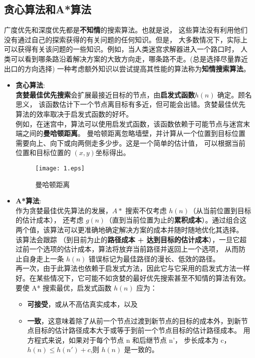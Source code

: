 \subsection{\textbf{贪心算法和A*算法}}
广度优先和深度优先都是\textbf{不知情}的搜索算法。也就是说，
这些算法没有利用他们没有通过自己的探索获得的有关问题的任何知识。但是，
大多数情况下，实际上可以获得有关该问题的一些知识。例如，当人类迷宫求解器进入一个路口时，
人类可以看到哪条路沿着解决方案的大致方向走，哪条路不走。(总是选择尽量靠近出口的方向选择)
一种考虑额外知识以尝试提高其性能的算法称为\textbf{知情搜索算法}。
\begin{itemize}
    \item \textbf{贪心算法}: \\
    \textbf{贪婪最佳优先搜索}会扩展最接近目标的节点，由\textbf{启发式函数$h(n)$} 确定。顾名思义，
    该函数估计下一个节点离目标有多近，但可能会出错。贪婪最佳优先算法的效率取决于启发式函数的好坏。\\
    例如，在迷宫中，算法可以使用启发式函数，该函数依赖于可能节点与迷宫末端之间的\textbf{曼哈顿距离}。
    曼哈顿距离忽略墙壁，并计算从一个位置到目标位置需要向上、向下或向两侧走多少步。这是一个简单的估计值，
    可以根据当前位置和目标位置的 $(x,y) $坐标得出。

    \begin{figure}[htbp]
        \centering
         \texttt{[image: 1.eps]}
         \caption{曼哈顿距离}
         \label{manhadun}
      \end{figure}

    \item \textbf{A*算法}: \\作为贪婪最佳优先算法的发展，$A*$ 搜索不仅考虑 $h(n)$（从当前位置到目标的估计成本），
    还考虑 $g(n)$（直到当前位置为止的\textbf{累积成本}）。通过组合这两个值，该算法可以更准确地确定解决方案的成本并随时随地优化其选择。
    该算法会跟踪 （到目前为止的\textbf{路径成本 + 达到目标的估计成本}），一旦它超过前一个选项的估计成本，算法将放弃当前路径并返回上一个选项，
    从而防止自身走上一条 $h(n)$ 错误标记为最佳路径的漫长、低效的路径。\\
    再一次，由于此算法也依赖于启发式方法，因此它与它采用的启发式方法一样好。在某些情况下，它可能不如贪婪的最好优先搜索甚至不知情的算法有效。
    要使 A* 搜索最优，启发式函数 $h(n)$ 应为：
    \begin{itemize}
        \item \textbf{可接受}，或从不高估真实成本，以及
        \item \textbf{一致}，这意味着除了从前一个节点过渡到新节点的目标的成本外，到新节点目标的估计路径成本大于或等于到前一个节点目标的估计路径成本。
        用方程式来说，如果对于每个节点 n 和后继节点 n'，
        步长成本为 c，$h(n) ≤ h(n') + c$,则 $h(n)$ 是一致的。
    \end{itemize}
    \end{itemize}


